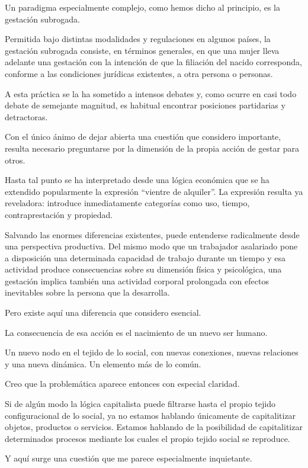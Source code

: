 \documentclass[12pt]{article}
\begin{document}
Un paradigma especialmente complejo, como hemos dicho al principio, es la gestación subrogada.

Permitida bajo distintas modalidades y regulaciones en algunos países, la gestación subrogada consiste, en términos generales, en que una mujer lleva adelante una gestación con la intención de que la filiación del nacido corresponda, conforme a las condiciones jurídicas existentes, a otra persona o personas.

A esta práctica se la ha sometido a intensos debates y, como ocurre en casi todo debate de semejante magnitud, es habitual encontrar posiciones partidarias y detractoras.

Con el único ánimo de dejar abierta una cuestión que considero importante, resulta necesario preguntarse por la dimensión de la propia acción de gestar para otros.

Hasta tal punto se ha interpretado desde una lógica económica que se ha extendido popularmente la expresión ``vientre de alquiler''. La expresión resulta ya reveladora: introduce inmediatamente categorías como uso, tiempo, contraprestación y propiedad.

Salvando las enormes diferencias existentes, puede entenderse radicalmente desde una perspectiva productiva. Del mismo modo que un trabajador asalariado pone a disposición una determinada capacidad de trabajo durante un tiempo y esa actividad produce consecuencias sobre su dimensión física y psicológica, una gestación implica también una actividad corporal prolongada con efectos inevitables sobre la persona que la desarrolla.

Pero existe aquí una diferencia que considero esencial.

La consecuencia de esa acción es el nacimiento de un nuevo ser humano.

Un nuevo nodo en el tejido de lo social, con nuevas conexiones, nuevas relaciones y una nueva dinámica. Un elemento más de lo común.

Creo que la problemática aparece entonces con especial claridad.

Si de algún modo la lógica capitalista puede filtrarse hasta el propio tejido configuracional de lo social, ya no estamos hablando únicamente de capitalitizar objetos, productos o servicios. Estamos hablando de la posibilidad de capitalitizar determinados procesos mediante los cuales el propio tejido social se reproduce.

Y aquí surge una cuestión que me parece especialmente inquietante.
\end{document}
